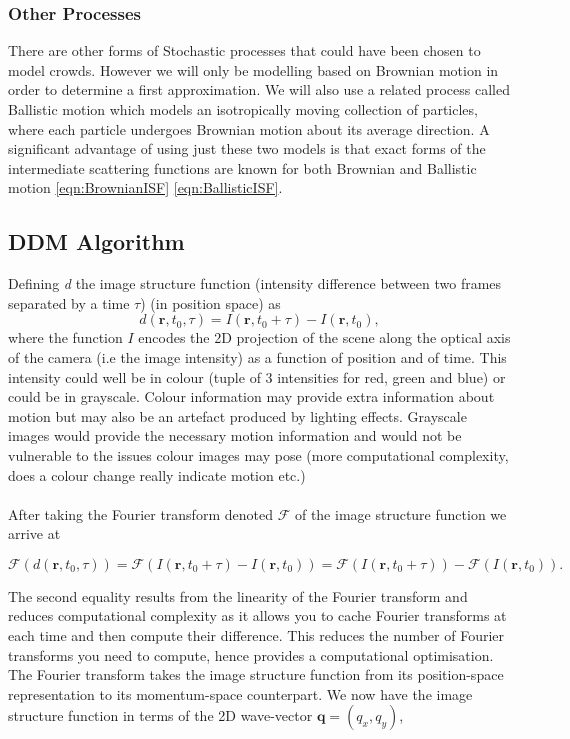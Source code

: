 \documentclass[11pt]{article}
\begin{document}
\subsubsection{Other Processes}
There are other forms of Stochastic processes that could have been chosen to model crowds. However we will only be modelling based on Brownian motion in order to determine a first approximation. We will also use a related process called Ballistic motion which models an isotropically moving collection of particles, where each particle undergoes Brownian motion about its average direction. A significant advantage of using just these two models is that exact forms of the intermediate scattering functions are known for both Brownian and Ballistic motion \ref{eqn:BrownianISF} \ref{eqn:BallisticISF}. 

\subsection{DDM Algorithm}
Defining \textit{d} the image structure function (intensity difference between two frames separated by a time $\tau$) (in position space) as
\begin{equation}
    d(\textbf{r}, t_0, \tau) = I(\mathbf{r}, t_0 + \tau) - I(\mathbf{r}, t_0),
\end{equation}
where the function $\textit{I}$ encodes the 2D projection of the scene along the optical axis of the camera (i.e the image intensity) as a function of position and of time. This intensity could well be in colour (tuple of 3 intensities for red, green and blue) or could be in grayscale. Colour information may provide extra information about motion but may also be an artefact produced by lighting effects. Grayscale images would provide the necessary motion information and would not be vulnerable to the issues colour images may pose (more computational complexity, does a colour change really indicate motion etc.)
\\\\
After taking the Fourier transform denoted $ \mathscr{F}$ of the image structure function we arrive at

\begin{equation}
    \mathscr{F} (d(\textbf{r}, t_0, \tau) ) = \mathscr{F} (I(\mathbf{r}, t_0 + \tau) - I(\mathbf{r}, t_0)) = \mathscr{F}(I(\mathbf{r}, t_0 + \tau)) - \mathscr{F}(I(\mathbf{r}, t_0)).
\end{equation}

The second equality results from the linearity of the Fourier transform and reduces computational complexity as it allows you to cache Fourier transforms at each time and then compute their difference.
This reduces the number of Fourier transforms you need to compute, hence provides a computational optimisation.\cite{ddm2}
The Fourier transform takes the image structure function from its position-space representation to its momentum-space counterpart. We now have the image structure function in terms of the 2D wave-vector $\textbf{q} =  (q_x, q_y)$,
\end{document}
